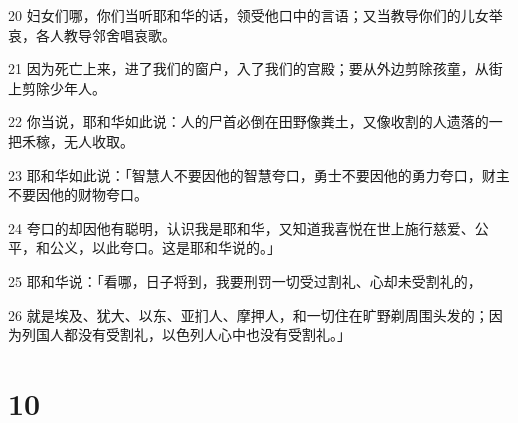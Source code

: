 \par 20 妇女们哪，你们当听耶和华的话，领受他口中的言语；又当教导你们的儿女举哀，各人教导邻舍唱哀歌。
\par 21 因为死亡上来，进了我们的窗户，入了我们的宫殿；要从外边剪除孩童，从街上剪除少年人。
\par 22 你当说，耶和华如此说：人的尸首必倒在田野像粪土，又像收割的人遗落的一把禾稼，无人收取。
\par 23 耶和华如此说：「智慧人不要因他的智慧夸口，勇士不要因他的勇力夸口，财主不要因他的财物夸口。
\par 24 夸口的却因他有聪明，认识我是耶和华，又知道我喜悦在世上施行慈爱、公平，和公义，以此夸口。这是耶和华说的。」
\par 25 耶和华说：「看哪，日子将到，我要刑罚一切受过割礼、心却未受割礼的，
\par 26 就是埃及、犹大、以东、亚扪人、摩押人，和一切住在旷野剃周围头发的；因为列国人都没有受割礼，以色列人心中也没有受割礼。」

\chapter{10}


